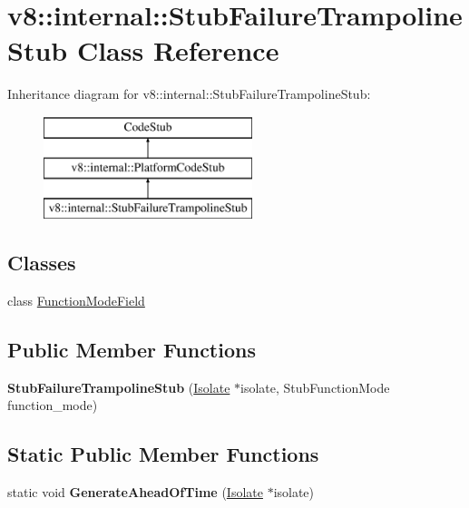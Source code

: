 \hypertarget{classv8_1_1internal_1_1_stub_failure_trampoline_stub}{}\section{v8\+:\+:internal\+:\+:Stub\+Failure\+Trampoline\+Stub Class Reference}
\label{classv8_1_1internal_1_1_stub_failure_trampoline_stub}
Inheritance diagram for v8\+:\+:internal\+:\+:Stub\+Failure\+Trampoline\+Stub\+:\begin{figure}[H]
\begin{center}
\leavevmode
\includegraphics[height=3.000000cm]{classv8_1_1internal_1_1_stub_failure_trampoline_stub}
\end{center}
\end{figure}
\subsection*{Classes}
\begin{DoxyCompactItemize}
\item 
class \hyperlink{classv8_1_1internal_1_1_stub_failure_trampoline_stub_1_1_function_mode_field}{Function\+Mode\+Field}
\end{DoxyCompactItemize}
\subsection*{Public Member Functions}
\begin{DoxyCompactItemize}
\item 
{\bfseries Stub\+Failure\+Trampoline\+Stub} (\hyperlink{classv8_1_1internal_1_1_isolate}{Isolate} $\ast$isolate, Stub\+Function\+Mode function\+\_\+mode)\hypertarget{classv8_1_1internal_1_1_stub_failure_trampoline_stub_a653a40d395f1f12044dd0bf479d59911}{}\label{classv8_1_1internal_1_1_stub_failure_trampoline_stub_a653a40d395f1f12044dd0bf479d59911}

\end{DoxyCompactItemize}
\subsection*{Static Public Member Functions}
\begin{DoxyCompactItemize}
\item 
static void {\bfseries Generate\+Ahead\+Of\+Time} (\hyperlink{classv8_1_1internal_1_1_isolate}{Isolate} $\ast$isolate)\hypertarget{classv8_1_1internal_1_1_stub_failure_trampoline_stub_ac64ef709e612c5dd2492247e8955bb6a}{}\label{classv8_1_1internal_1_1_stub_failure_trampoline_stub_ac64ef709e612c5dd2492247e8955bb6a}

\end{DoxyCompactItemize}
